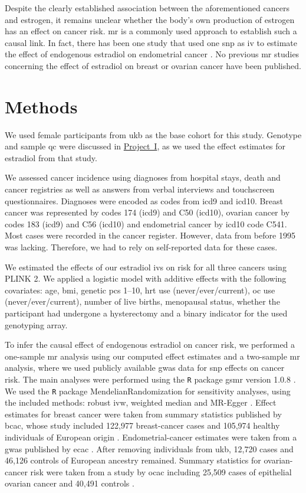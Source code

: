 \documentclass[draft]{scrbook}
\begin{document}
Despite the clearly established association between the aforementioned cancers and estrogen, it remains unclear whether the body's own production of estrogen has an effect on cancer risk.
\gls{mr} is a commonly used approach to establish such a causal link.
In fact, there has been one study that used one \gls{snp} as \gls{iv} to estimate the effect of endogenous estradiol on endometrial cancer \cite{Thompson2016}.
No previous \gls{mr} studies concerning the effect of estradiol on breast or ovarian cancer have been published.

\section{Methods}
We used female participants from \gls{ukb} as the base cohort for this study.
Genotype and sample \gls{qc} were discussed in \hyperref[p1methods]{Project~I}, as we used the effect estimates for estradiol from that study.

We assessed cancer incidence using diagnoses from hospital stays, death and cancer registries as well as answers from verbal interviews and touchscreen questionnaires.
Diagnoses were encoded as codes from \gls{icd9} and \gls{icd10}.
Breast cancer was represented by codes 174 (\gls{icd9}) and C50 (\gls{icd10}), ovarian cancer by codes 183 (\gls{icd9}) and C56 (\gls{icd10}) and endometrial cancer by \gls{icd10} code C541.
Most cases were recorded in the cancer register.
However, data from before 1995 was lacking.
Therefore, we had to rely on self-reported data for these cases.

We estimated the effects of our estradiol \glspl{iv} on risk for all three cancers using \textsf{PLINK 2}.
We applied a logistic model with additive effects with the following covariates: age, \gls{bmi}, genetic \glspl{pc} 1--10, \gls{hrt} use (never/ever/current), \gls{oc} use (never/ever/current), number of live births, menopausal status, whether the participant had undergone a hysterectomy and a binary indicator for the used genotyping array.

To infer the causal effect of endogenous estradiol on cancer risk, we performed a one-sample \gls{mr} analysis using our computed effect estimates and a two-sample \gls{mr} analysis, where we used publicly available \gls{gwas} data for \gls{snp} effects on cancer risk.
The main analyses were performed using the \texttt{R} package \textsf{gsmr} version 1.0.8 \cite{Zhu2018}.
We used the \texttt{R} package \textsf{MendelianRandomization} for sensitivity analyses, using the included methods: robust \gls{ivw}, weighted median and MR-Egger \cite{Olena2017}.
Effect estimates for breast cancer were taken from summary statistics published by \gls{bcac}, whose study included 122,977 breast-cancer cases and 105,974 healthy individuals of European origin \cite{Michailidou2017}.
Endometrial-cancer estimates were taken from a \gls{gwas} published by \gls{ecac} \cite{OMara2018}.
After removing individuals from \gls{ukb}, 12,720 cases and 46,126 controls of European ancestry remained.
Summary statistics for ovarian-cancer risk were taken from a study by \gls{ocac} including 25,509 cases of epithelial ovarian cancer and 40,491 controls \cite{Phelan2017}.
\end{document}
